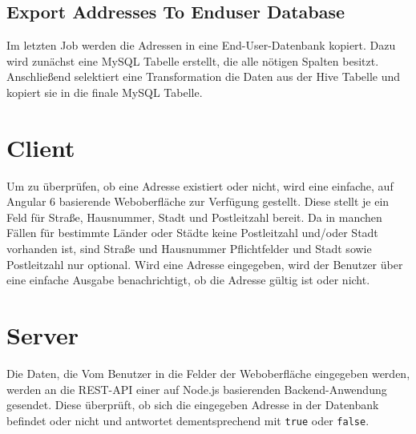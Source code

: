 \documentclass[
	a4paper,
	12p,
	bibliography=totocnumbered
]{scrartcl}
\begin{document}
	
\subsection{Export Addresses To Enduser Database}

Im letzten Job werden die Adressen in eine End-User-Datenbank kopiert. Dazu wird zunächst eine MySQL Tabelle erstellt, die alle nötigen Spalten besitzt. Anschließend selektiert eine Transformation die Daten aus der Hive Tabelle und kopiert sie in die finale MySQL Tabelle.


\section{Client}

Um zu überprüfen, ob eine Adresse existiert oder nicht, wird eine einfache, auf Angular 6 basierende Weboberfläche zur Verfügung gestellt. Diese stellt je ein Feld für Straße, Hausnummer, Stadt und Postleitzahl  bereit. Da in manchen Fällen für bestimmte Länder oder Städte keine Postleitzahl und/oder Stadt vorhanden ist, sind Straße und Hausnummer Pflichtfelder und Stadt sowie Postleitzahl nur optional. Wird eine Adresse eingegeben, wird der Benutzer über eine einfache Ausgabe benachrichtigt, ob die Adresse gültig ist oder nicht.

\section{Server}

Die Daten, die Vom Benutzer in die Felder der Weboberfläche eingegeben werden, werden an die REST-API einer auf Node.js basierenden Backend-Anwendung gesendet. Diese überprüft, ob sich die eingegeben Adresse in der Datenbank befindet oder nicht und antwortet dementsprechend mit \texttt{true} oder \texttt{false}.
\end{document}
